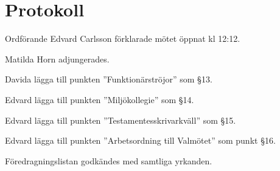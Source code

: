 \documentclass[10pt]{article}
\def\mo{Edvard Carlsson}
\begin{document}
\section*{Protokoll}
\begin{paragrafer}
Ordförande {\mo} förklarade mötet öppnat kl 12:12.

{\valavmo}

{\valavms}

{\valavj}

{\tosg}

Matilda Horn adjungerades. 






Davida \ypa lägga till punkten ''Funktionärströjor'' som \S13.

Edvard \ypa lägga till punkten ''Miljökollegie'' som \S14.

Edvard \ypa lägga till punkten ''Testamentesskrivarkväll'' som \S15. 

Edvard \ypa lägga till punkten ''Arbetsordning till Valmötet'' som punkt \S16. 

Föredragningslistan godkändes med samtliga yrkanden.

\textit{\ingaprot}

\begin{fyllnadsval} %


\end{fyllnadsval}
\end{paragrafer}
\end{document}
